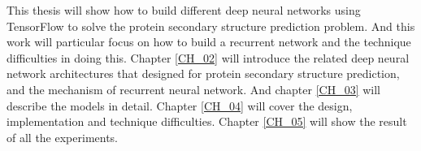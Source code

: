 This thesis will show how to build different deep neural networks using TensorFlow to solve the protein secondary structure prediction problem. And this work will particular focus on how to build a recurrent network and the technique difficulties in doing this. Chapter \ref{CH_02} will introduce the related deep neural network architectures that designed for protein secondary structure prediction, and the mechanism of recurrent neural network. And chapter \ref{CH_03} will describe the models in detail. Chapter \ref{CH_04} will cover the design, implementation and technique difficulties. Chapter \ref{CH_05} will show the result of all the experiments.
